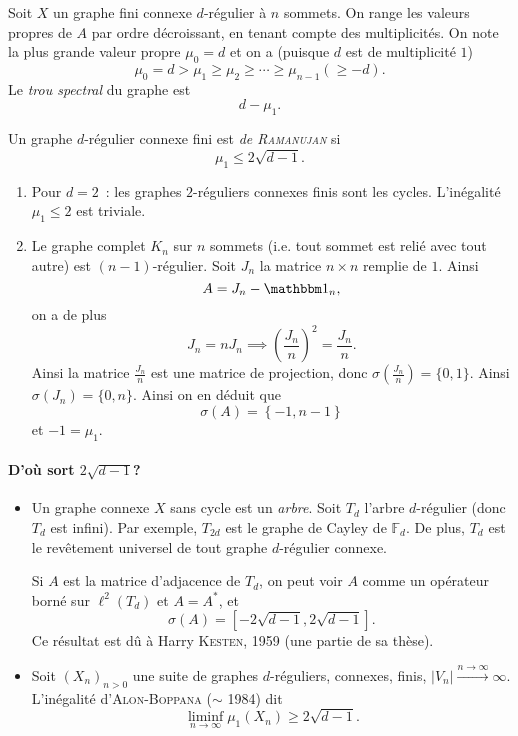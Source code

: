 Soit $X$ un graphe fini connexe $d$-régulier à $n$ sommets. On range les valeurs propres de $A$ par ordre
décroissant, en tenant compte des multiplicités. On note la plus grande valeur propre $\mu_0 = d$ et on a
(puisque $d$ est de multiplicité $1$) 
\[ \mu_0 = d > \mu_1 \geq \mu_2 \geq \cdots \geq \mu_{n-1} (\geq -d). \]
Le \emph{trou spectral} du graphe est 
\[ d - \mu_1. \]

\begin{defi}
  Un graphe $d$-régulier connexe fini est \emph{de \textsc{Ramanujan}} si 
  \[ \mu_1 \leq 2 \sqrt{d - 1}. \]
\end{defi}


\begin{exs}
  \begin{enumerate}
  \item Pour $d = 2$~: les graphes $2$-réguliers connexes finis sont les cycles. L'inégalité $\mu_1 \leq 2$
    est triviale.
  \item Le graphe complet $K_n$ sur $n$ sommets (i.e. tout sommet est relié avec tout
    autre) est $(n-1)$-régulier. Soit $J_n$ la matrice $n \times n$ remplie de $1$. Ainsi 
    \[ A = J_n - \un_n, \]
    on a de plus 
    \[ J_n = n J_n \implies \left(\frac{J_n}{n}\right)^2 = \frac{J_n}{n}. \]
    Ainsi la matrice $\frac{J_n}{n}$ est une matrice de projection, donc $\sigma\left( \frac{J_n}{n} \right) =
    \{0,1\}$. Ainsi $\sigma(J_n) = \{0,n\}$. Ainsi on en déduit que 
    \[ \sigma(A) = \left\{-1, n-1\right\} \]
    et $-1 = \mu_1$.
  \end{enumerate}
\end{exs}

\paragraph{D'où sort $2\sqrt{d-1}$?}

\begin{itemize}
\item Un graphe connexe $X$ sans cycle est un \emph{arbre}. Soit $T_d$ l'arbre $d$-régulier (donc
  $T_d$ est infini). Par exemple, $T_{2d}$ est le graphe de Cayley de $\mathbb{F}_d$. De plus, $T_d$ est le
  revêtement universel de tout graphe $d$-régulier connexe.

  Si $A$ est la matrice d'adjacence de $T_d$, on peut voir $A$ comme un opérateur borné sur $\ell^2(T_d)$ et
  $A = A^\ast$, et
  \[ \sigma(A) = \left[ -2 \sqrt{d-1}, 2 \sqrt{d-1} \right]. \] Ce résultat est dû à Harry \textsc{Kesten},
  1959 (une partie de sa thèse).

  
\item Soit $(X_n)_{n > 0}$ une suite de graphes $d$-réguliers, connexes, finis, $|V_n| \xrightarrow{n \to
    \infty} \infty$. L'inégalité d'\textsc{Alon-Boppana} ($\sim$ 1984) dit 
  \[ \liminf_{n \to \infty} \mu_1(X_n) \geq 2 \sqrt{d-1}. \]
\end{itemize}

